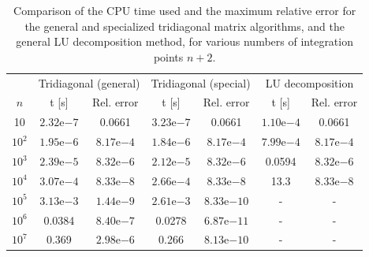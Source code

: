 \documentclass[a4paper,english]{article}
\begin{document}
\begin{table}[ht]
  \centering
  \begin{tabular}{c c c c c c c} \toprule
    & \multicolumn{2}{c}{Tridiagonal (general)} & \multicolumn{2}{c}{Tridiagonal (special)} & \multicolumn{2}{c}{LU decomposition}\\\cmidrule(lr){2-3} \cmidrule(lr){4-5} \cmidrule(lr){6-7}
    $n$ & t [s] & Rel. error & t [s] & Rel. error & t [s] & Rel. error \\\midrule
    10 & $2.32\mathrm{e}{-7}$ & 0.0661 & $3.23\mathrm{e}{-7}$ & 0.0661 & $1.10\mathrm{e}{-4}$ & 0.0661 \\
    $10^2$ & $1.95\mathrm{e}{-6}$ & $8.17\mathrm{e}{-4}$ & $1.84\mathrm{e}{-6}$ & $8.17\mathrm{e}{-4}$ & $7.99\mathrm{e}{-4}$ & $8.17\mathrm{e}{-4}$ \\
    $10^3$ & $2.39\mathrm{e}{-5}$ & $8.32\mathrm{e}{-6}$ & $2.12\mathrm{e}{-5}$ & $8.32\mathrm{e}{-6}$ & 0.0594 & $8.32\mathrm{e}{-6}$ \\
    $10^4$ & $3.07\mathrm{e}{-4}$ & $8.33\mathrm{e}{-8}$ & $2.66\mathrm{e}{-4}$ & $8.33\mathrm{e}{-8}$ & 13.3 & $8.33\mathrm{e}{-8}$ \\
    $10^5$ & $3.13\mathrm{e}{-3}$ & $1.44\mathrm{e}{-9}$ & $2.61\mathrm{e}{-3}$ & $8.33\mathrm{e}{-10}$ & - & - \\
    $10^6$ & 0.0384 & $8.40 \mathrm{e}{-7}$ & 0.0278 & $6.87 \mathrm{e}{-11}$ & - & - \\
    $10^7$ & 0.369 & $2.98 \mathrm{e}{-6}$ & 0.266 & $8.13 \mathrm{e}{-10}$ & - & - \\\bottomrule
  \end{tabular}
  \caption{Comparison of the CPU time used and the maximum relative error for the general and specialized tridiagonal matrix algorithms, and the general LU decomposition method, for various numbers of integration points $n+2$.}
  \label{tab:mainresults}
\end{table}
\end{document}
